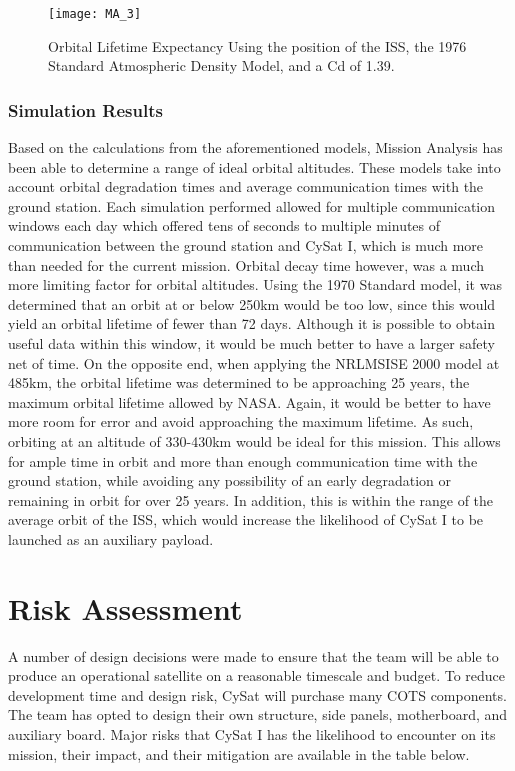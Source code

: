 \documentclass[nocover]            %
{CSLI}                       %
\begin{document}
\begin{figure}[H]
    \texttt{[image: MA\_3]}
    \caption{Orbital Lifetime Expectancy Using the position of the ISS, the 1976 Standard Atmospheric Density Model, and a Cd of 1.39.}
\end{figure}


\subsubsection{Simulation Results}
Based on the calculations from the aforementioned models, Mission Analysis has been able to determine a range of ideal orbital altitudes. These models take into account orbital degradation times and average communication times with the ground station. Each simulation performed allowed for multiple communication windows each day which offered tens of seconds to multiple minutes of communication between the ground station and CySat I, which is much more than needed for the current mission. Orbital decay time however, was a much more limiting factor for orbital altitudes. Using the 1970 Standard model, it was determined that an orbit at or below 250km would be too low, since this would yield an orbital lifetime of fewer than 72 days. Although it is possible to obtain useful data within this window, it would be much better to have a larger safety net of time. On the opposite end, when applying the NRLMSISE 2000 model at 485km, the orbital lifetime was determined to be approaching 25 years, the maximum orbital lifetime allowed by NASA. Again, it would be better to have more room for error and avoid approaching the maximum lifetime. As such, orbiting at an altitude of 330-430km would be ideal for this mission. This allows for ample time in orbit and more than enough communication time with the ground station, while avoiding any possibility of an early degradation or remaining in orbit for over 25 years. In addition, this is within the range of the average orbit of the ISS, which would increase the likelihood of CySat I to be launched as an auxiliary payload.
\section{Risk Assessment}
A number of design decisions were made to ensure that the team will be able to produce an operational satellite on a reasonable timescale and budget. To reduce development time and design risk, CySat will purchase many COTS components. The team has opted to design their own structure, side panels, motherboard, and auxiliary board. Major risks that CySat I has the likelihood to encounter on its mission, their impact, and their mitigation are available in the table below. 
\end{document}
